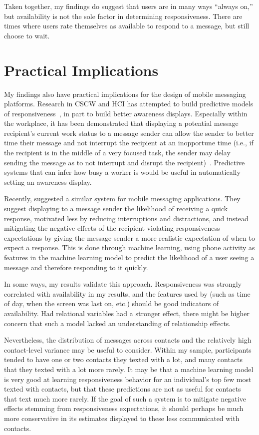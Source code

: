 \documentclass[12pt]{nuthesis}	%
\begin{document}
Taken together, my findings do suggest that users are in many ways ``always on,'' but availability is not the sole factor in determining responsiveness. There are times where users rate themselves as available to respond to a message, but still choose to wait.


\section{Practical Implications}

My findings also have practical implications for the design of mobile messaging platforms. Research in CSCW and HCI has attempted to build predictive models of responsiveness~\citep[e.g.,][]{avrahami2007improving,avrahami2008waiting,dabbish2005understanding}, in part to build better awareness displays. Especially within the workplace, it has been demonstrated that displaying a potential message recipient's current work status to a message sender can allow the sender to better time their message and not interrupt the recipient at an inopportune time (i.e., if the recipient is in the middle of a very focused task, the sender may delay sending the message as to not interrupt and disrupt the recipient)~\citep{dabbish2004awareness}. Predictive systems that can infer how busy a worker is would be useful in automatically setting an awareness display.

Recently, \citet{pielot2014didn} suggested a similar system for mobile messaging applications. They suggest displaying to a message sender the likelihood of receiving a quick response, motivated less by reducing interruptions and distractions, and instead mitigating the negative effects of the recipient violating responsiveness expectations by giving the message sender a more realistic expectation of when to expect a response. This is done through machine learning, using phone activity as features in the machine learning model to predict the likelihood of a user seeing a message and therefore responding to it quickly.

In some ways, my results validate this approach. Responsiveness was strongly correlated with availability in my results, and the features used by \citet{pielot2014didn} (such as time of day, when the screen was last on, etc.) should be good indicators of availability. Had relational variables had a stronger effect, there might be higher concern that such a model lacked an understanding of relationship effects.

Nevertheless, the distribution of messages across contacts and the relatively high contact-level variance may be useful to consider. Within my sample, participants tended to have one or two contacts they texted with a lot, and many contacts that they texted with a lot more rarely. It may be that a machine learning model is very good at learning responsiveness behavior for an individual's top few most texted with contacts, but that these predictions are not as useful for contacts that text much more rarely. If the goal of such a system is to mitigate negative effects stemming from responsiveness expectations, it should perhaps be much more conservative in its estimates displayed to these less communicated with contacts.
\end{document}
